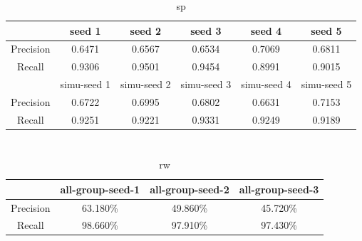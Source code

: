 \documentclass[runningheads,a4paper]{llncs}
\begin{document}
\begin{table}
\centering
\begin{tabular}{|c|c|c|c|c|c|}
\hline
 & seed 1 & seed 2&seed 3&seed 4&seed 5 \\
\hline
Precision& 0.6471 & 0.6567 & 0.6534& 0.7069& 0.6811 \\
\hline
Recall& 0.9306 & 0.9501 & 0.9454& 0.8991& 0.9015 \\
\hline
 & simu-seed 1 & simu-seed 2&simu-seed 3&simu-seed 4&simu-seed 5 \\
\hline
Precision& 0.6722 & 0.6995 & 0.6802& 0.6631& 0.7153 \\
\hline
Recall& 0.9251 & 0.9221 & 0.9331& 0.9249& 0.9189 \\
\hline
\end{tabular}
\caption{sp}
\end{table} 


\section{}









\begin{table}
\centering
\begin{tabular}{|c|c|c|c|}
\hline
& all-group-seed-1&all-group-seed-2&all-group-seed-3 \\
\hline
Precision&63.180\% &49.860\% &45.720\% \\
\hline
Recall&98.660\% &97.910\% &97.430\%  \\
\hline
\end{tabular}
\caption{rw}
\end{table} 









\end{document}
